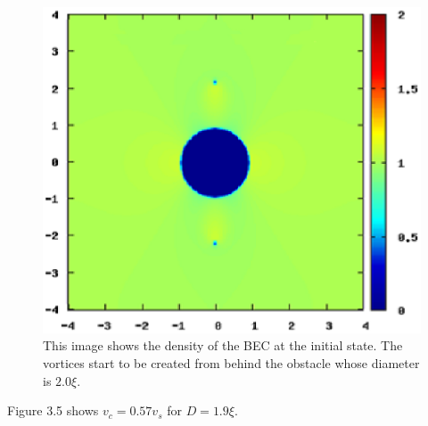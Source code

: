 \documentclass[12pt,a4paper]{report}
\begin{document}
\begin{figure}[htbp]\begin{center}
\includegraphics[scale=0.6,keepaspectratio]{3-5.eps}
\caption{
This image shows the density of the BEC at the initial state.
The vortices start to be created from behind the obstacle whose diameter is $2.0\xi$.
}
\label{FIG:3-5}
\end{center}\end{figure}
Figure 3.5 shows $v_c = 0.57v_s$ for $D = 1.9\xi$.

\newpage
\end{document}

